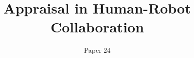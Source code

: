 \documentclass{aamas2016}
\begin{document}
\algnewcommand{}
\algnewcommand{}



\title{Appraisal in Human-Robot Collaboration}




%
%
%
%

%


\author{
%
\alignauthor
Paper 24
}
\end{document}
